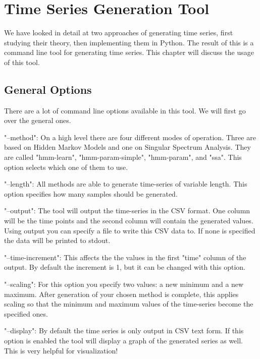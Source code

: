 \chapter{Time Series Generation Tool}\label{chapter:tool}

We have looked in detail at two approaches of generating time series, first studying their theory, then implementing them in Python. The result of this is a command line tool for generating time series. This chapter will discuss the usage of this tool. \parencite{tsgenerator}

\section{General Options}

There are a lot of command line options available in this tool. We will first go over the general ones. 

"--method": On a high level there are four different modes of operation. Three are based on Hidden Markov Models and one on Singular Spectrum Analysis. They are called "hmm-learn", "hmm-param-simple", "hmm-param", and "ssa". This option selects which one of them to use. 

"--length": All methods are able to generate time-series of variable length. This option specifies how many samples should be generated. 

"--output": The tool will output the time-series in the CSV format. One column will be the time points and the second column will contain the generated values. Using output you can specify a file to write this CSV data to. If none is specified the data will be printed to stdout. 

"--time-increment": This affects the the values in the first "time" column of the output. By default the increment is 1, but it can be changed with this option. 

"--scaling": For this option you specify two values: a new minimum and a new maximum. After generation of your chosen method is complete, this applies scaling so that the minimum and maximum values of the time-series become the specified ones. 

"--display": By default the time series is only output in CSV text form. If this option is enabled the tool will display a graph of the generated series as well. This is very helpful for visualization!

